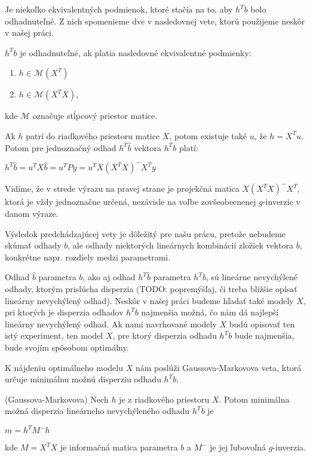 Je niekoľko ekvivalentných podmienok, ktoré stačia na to, aby $h^T b$ bolo odhadnuteľné. 
Z nich spomenieme dve v nasledovnej vete, ktorú použijeme neskôr v našej práci.

\begin{theorem}
\label{veta1}
$h^T b$ je odhadnuteľné, ak platia nasledovné ekvivalentné podmienky:
\begin{enumerate}
  \item $h \in \mathcal{M}(X^T)$
  \item $h \in \mathcal{M}(X^T X)$,
\end{enumerate}
kde $\mathcal{M}$ označuje stĺpcový priestor matice.
\end{theorem}

Ak $h$ patrí do riadkového priestoru matice $X$, potom existuje také $u$, že $h = X^T u$.
Potom pre jednoznačný odhad $h^T \hat{b}$ vektora $h^T b$ platí:

\begin{center}
$h^T \hat{b} = u^T X \hat{b} = u^T P y = u^T X(X^T X)^- X^T y$
\end{center}

Vidíme, že v strede výrazu na pravej strane je projekčná matica $X(X^T X)^- X^T$, ktorá je vždy jednoznačne určená, 
nezávisle na voľbe zovšeobecnenej $g$-inverzie v danom výraze.

Výsledok predchádzajúcej vety je dôležitý pre našu prácu, pretože nebudeme skúmať odhady $b$,
ale odhady niektorých lineárnych kombinácií zložiek vektora $b$, 
konkrétne napr. rozdiely medzi parametrami.

Odhad $\hat{b}$ parametra $b$, ako aj odhad $h^T \hat{b}$ parametra $h^T b$, sú lineárne nevychýlené odhady,
ktorým prislúcha disperzia (TODO: popremýšľaj, či treba bližšie opísať lineárny nevychýlený odhad). 
Neskôr v našej práci budeme hľadať také modely $X$, pri ktorých je disperzia odhadov $h^T b$ najmenšia možná,
čo nám dá najlepší lineárny nevychýlený odhad. 
Ak nami navrhované modely $X$ budú opisovať ten istý experiment, ten model $X$,
pre ktorý disperzia odhadu $h^T b$ bude najmenšia, bude svojím spôsobom optimálny.

K nájdeniu optimálneho modelu $X$ nám poslúži Gaussova-Markovova veta, 
ktorá určuje minimálnu možnú disperziu odhadu $h^T b$.

\begin{theorem}
\label{gauss-markov}
(Gaussova-Markovova) Nech $h$ je z riadkového priestoru $X$. 
Potom minimálna možná disperzia lineárneho nevychýleného odhadu $h^T b$ je

\begin{center}
$
m = h^T M^- h
$
\end{center}

kde $M = X^T X$ je informačná matica parametra $b$ a $M^-$ je jej ľubovoľná $g$-inverzia.
\end{theorem}

